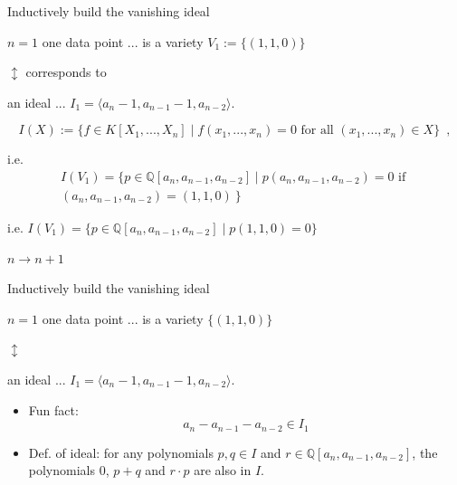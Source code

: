 \documentclass[t,usenames,dvipsnames]{beamer} %
\newcommand{\Q}{\mathbb Q}
\newcommand{\1}{\boldsymbol{1}}
\newcommand{\0}{\boldsymbol{0}}
\begin{document}
\begin{frame}{Inductively build the vanishing ideal}

    \begin{block}{$n=1$}
        one data point ... is a variety 
        $V_1 := \{ (1, 1, 0) \} $

        \begin{center}
        $\updownarrow$ corresponds to
        \end{center}

        an ideal ... $I_1 = \langle a_n - 1, a_{n-1} - 1, a_{n-2} \rangle$.
        \pause

$$ I(X) := \{ f \in K[X_1, ..., X_n] \mid f(x_1, ..., x_n) = 0 \text{ for all } (x_1, ..., x_n) \in X \}\enspace,  $$ 

        \pause

         i.e. \begin{align*} I(V_1) = \{ p \in \Q[a_n, a_{n-1}, a_{n-2}] \mid p(a_n, a_{n-1}, a_{n-2}) = 0  \text{ if }  \\  (a_n, a_{n-1}, a_{n-2}) = (1,1,0) \ \} \end{align*}

        \pause

         i.e. \( I(V_1) = \{ p \in \Q[a_n, a_{n-1}, a_{n-2}] \mid p(1,1,0) = 0 \} \)
    \end{block}

    \begin{block}{$n \to n+1$}

    \end{block}


\end{frame}

\begin{frame}{Inductively build the vanishing ideal}

    \begin{block}{$n=1$}
        one data point ... is a variety 
        $ \{ (1, 1, 0) \} $

        \begin{center}
        $\updownarrow$ 
        \end{center}

        an ideal ... $I_1 = \langle a_n - 1, a_{n-1} - 1, a_{n-2} \rangle$.

        \pause

        \begin{itemize}[<+->]
            \item
        Fun fact:
        $$a_n - a_{n-1} - a_{n-2} \in I_1$$
            \item
        Def. of ideal:
for any polynomials \(p, q \in I\) and \(r \in \mathbb{Q}[a_n, a_{n-1}, a_{n-2}]\), the polynomials $0$, \(p+q\) and \(r \cdot p\) are also in $I$.
        \end{itemize}

    \end{block}


\end{frame}
\end{document}
